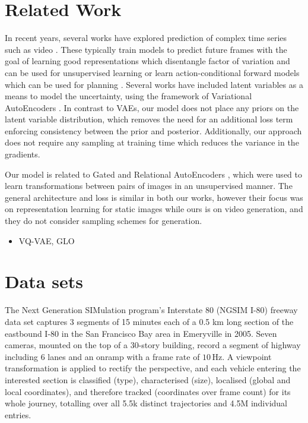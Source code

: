 \documentclass{article}
\begin{document}
\section{Related Work}

In recent years, several works have explored prediction of complex time series such as video \citep{mathieu-iclr-2016,canziani2017cortexnet}.
These typically train models to predict future frames with the goal of learning good representations which disentangle factor of variation and can be used for unsupervised learning \citep{Srivastava15, Villegas17, DentonB17} or learn action-conditional forward models which can be used for planning \citep{Oh15, FinnGL16, Poke, VideoPixel}.
Several works have included latent variables as a means to model the uncertainty, using the framework of Variational AutoEncoders \citep{Babaeizadeh2018, Denton2018}.
In contrast to VAEs, our model does not place any priors on the latent variable distribution, which removes the need for an additional loss term enforcing consistency between the prior and posterior.
Additionally, our approach does not require any sampling at training time which reduces the variance in the gradients.

Our model is related to Gated and Relational AutoEncoders \citep{RelationalAE, GAE}, which were used to learn transformations between pairs of images in an unsupervised manner.
The general architecture and loss is similar in both our works, however their focus was on representation learning for static images while ours is on video generation, and they do not consider sampling schemes for generation.

\begin{itemize}
\item VQ-VAE, GLO
\end{itemize}


\section{Data sets}

The Next Generation SIMulation program's Interstate 80 (NGSIM I-80) freeway data set \cite{halkias2006ngsim} captures 3 segments of 15 minutes each of a 0.5 km long section of the eastbound I-80 in the San Francisco Bay area in Emeryville in 2005.
Seven cameras, mounted on the top of a 30-story building, record a segment of highway including 6 lanes and an onramp with a frame rate of $10\,\text{Hz}$.
A viewpoint transformation is applied to rectify the perspective, and each vehicle entering the interested section is classified (type), characterised (size), localised (global and local coordinates), and therefore tracked (coordinates over frame count) for its whole journey, totalling over all 5.5k distinct trajectories and 4.5M individual entries.
\end{document}

